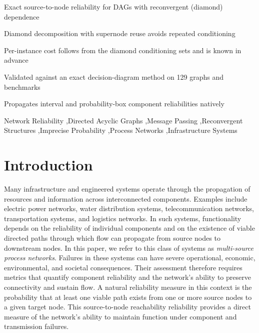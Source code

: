 \documentclass[preprint,12pt]{elsarticle}
\begin{document}
\begin{frontmatter}
\begin{highlights}
\item Exact source-to-node reliability for DAGs with reconvergent (diamond) dependence
\item Diamond decomposition with supernode reuse avoids repeated conditioning
\item Per-instance cost follows from the diamond conditioning sets and is known in advance
\item Validated against an exact decision-diagram method on 129 graphs and benchmarks
\item Propagates interval and probability-box component reliabilities natively
\end{highlights}


\begin{keyword}
Network Reliability \sep Directed Acyclic Graphs \sep Message Passing \sep Reconvergent Structures \sep Imprecise Probability \sep Process Networks \sep Infrastructure Systems
\end{keyword}

\end{frontmatter}




\section{Introduction}

Many infrastructure and engineered systems operate through the propagation of resources and information across interconnected components. Examples include electric power networks, water distribution systems, telecommunication networks, transportation systems, and logistics networks. In such systems, functionality depends on the reliability of individual components and on the existence of viable directed paths through which flow can propagate from source nodes to downstream nodes. In this paper, we refer to this class of systems as \emph{multi-source process networks}.
Failures in these systems can have severe operational, economic, environmental, and societal consequences. Their assessment therefore requires metrics that quantify component reliability and the network's ability to preserve connectivity and sustain flow. A natural reliability measure in this context is the probability that at least one viable path exists from one or more source nodes to a given target node. This source-to-node reachability reliability provides a direct measure of the network's ability to maintain function under component and transmission failures.
\end{document}
